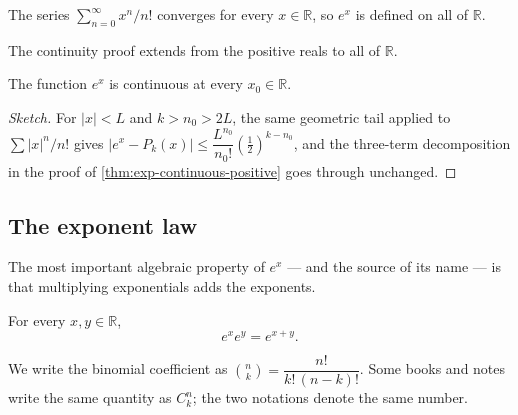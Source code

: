 \begin{corollary}\label{cor:exp-defined-on-R}
The series \(\sum_{n = 0}^{\infty} x^{n}/n!\) converges for every \(x \in \mathbb{R}\), so \(e^{x}\) is defined on all of \(\mathbb{R}\).
\end{corollary}

The continuity proof extends from the positive reals to all of \(\mathbb{R}\).

\begin{theorem}\label{thm:exp-continuous}
The function \(e^{x}\) is continuous at every \(x_{0} \in \mathbb{R}\).
\end{theorem}

\begin{proof}[Sketch]
For \(\lvert x \rvert < L\) and \(k > n_{0} > 2L\), the same geometric tail applied to \(\sum \lvert x \rvert^{n}/n!\) gives \(\lvert e^{x} - P_{k}(x) \rvert \le \dfrac{L^{n_{0}}}{n_{0}!}\left(\tfrac{1}{2}\right)^{k - n_{0}}\), and the three-term decomposition in the proof of \cref{thm:exp-continuous-positive} goes through unchanged.
\end{proof}

\subsection{The exponent law}

The most important algebraic property of \(e^{x}\) --- and the source of its name --- is that multiplying exponentials adds the exponents.

\begin{theorem}\label{thm:exponent-law}
For every \(x, y \in \mathbb{R}\),
\[
e^{x} e^{y} = e^{x + y}.
\]
\end{theorem}

\begin{caution}
We write the binomial coefficient as \(\binom{n}{k} = \dfrac{n!}{k!\,(n - k)!}\). Some books and notes write the same quantity as \(C^{n}_{k}\); the two notations denote the same number.
\end{caution}

